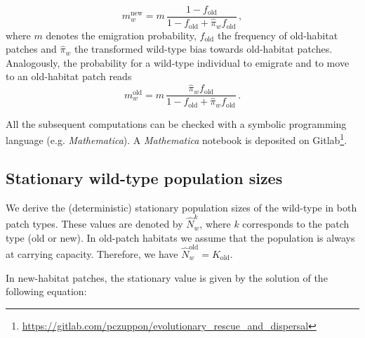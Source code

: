 \documentclass[11pt]{article}
\newcommand{\chg}[1]{\textcolor{change}{#1}}
\begin{document}
\begin{equation}\label{Seq:dispersal_rates_old}
m_w^{\text{new}} = m\, \frac{1-f_{\text{old}}}{1-f_{\text{old}} + \widehat{\pi}_w f_{\text{old}}}\, ,
\end{equation}
%
where $m$ denotes the emigration probability, $f_{\text{old}}$ the frequency of old-habitat patches and $\widehat{\pi}_w$ the transformed wild-type bias towards old-habitat patches.
Analogously, the probability for a wild-type individual \chg{to emigrate and} to move to an old-habitat patch reads
%
\begin{equation}\label{Seq:dispersal_rate_new}
m_w^{\text{old}} = m\, \frac{\widehat{\pi}_w f_{\text{old}}}{1-f_{\text{old}} + \widehat{\pi}_w f_{\text{old}}}\, .
\end{equation}

All the subsequent computations can be checked with a symbolic programming language (e.g. \textit{Mathematica}). A \textit{Mathematica} notebook is deposited on Gitlab\footnote{\url{https://gitlab.com/pczuppon/evolutionary\_rescue\_and\_dispersal}}.

\subsection*{Stationary wild-type population sizes}
We derive the (deterministic) stationary population sizes of the wild-type in both patch types. These values are denoted by $\widehat{N}_w^{k}$, where $k$ corresponds to the patch type (old or new). In old-patch habitats we assume that the population is always at carrying capacity. Therefore, we have $\widehat{N}_w^{\text{old}} = K_{\text{old}}$.

In new-habitat patches, the stationary value is given by the solution of the following equation:
\end{document}
